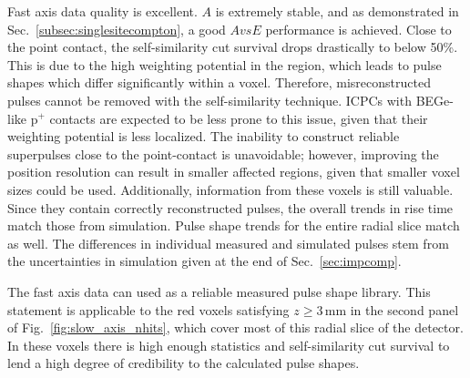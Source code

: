 Fast axis data quality is excellent. $A$ is extremely stable, and as demonstrated in Sec.~\ref{subsec:singlesitecompton}, a good $AvsE$ performance is achieved. Close to the point contact, the self-similarity cut survival drops drastically to below 50\%. This is due to the high weighting potential in the region, which leads to pulse shapes which differ significantly within a voxel. Therefore, misreconstructed pulses cannot be removed with the self-similarity technique. ICPCs with BEGe-like p$^+$ contacts are expected to be less prone to this issue, given that their weighting potential is less localized. The inability to construct reliable superpulses close to the point-contact is unavoidable; however, improving the position resolution can result in smaller affected regions, given that smaller voxel sizes could be used. Additionally, information from these voxels is still valuable. Since they contain correctly reconstructed pulses, the overall trends in rise time match those from simulation. Pulse shape trends for the entire radial slice match as well. The differences in individual measured and simulated pulses stem from the uncertainties in simulation given at the end of Sec.~\ref{sec:impcomp}.

The fast axis data can used as a reliable measured pulse shape library. This statement is applicable to the red voxels satisfying $z \ge 3$\,mm in the second panel of Fig.~\ref{fig:slow_axis_nhits}, which cover most of this radial slice of the detector. In these voxels there is high enough statistics and self-similarity cut survival to lend a high degree of credibility to the calculated pulse shapes.